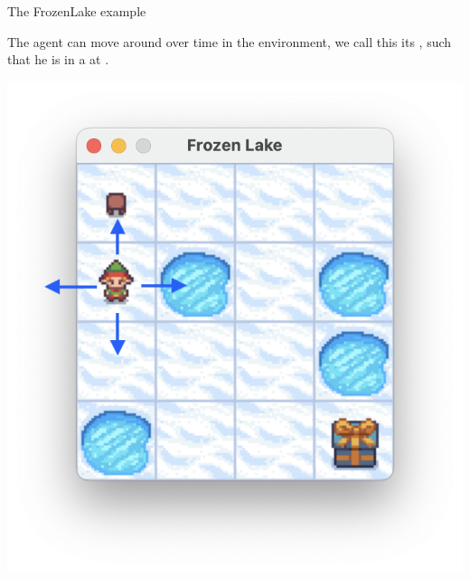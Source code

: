 \documentclass[aspectratio=169,xcolor=dvipsnames]{beamer}
\begin{document}
\begin{frame}{The FrozenLake example}

The agent can move around over time in the environment, we call this its , such that he is in a  at .

\centering
\includegraphics[scale=0.5]{images/moving-agent.png}

\end{frame}

\end{document}
